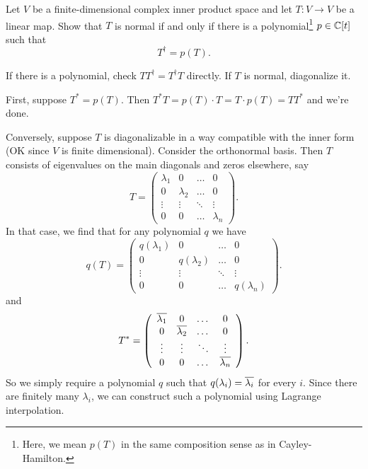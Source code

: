 \begin{problem}
	Let $V$ be a finite-dimensional complex inner product space and let $T \colon V \to V$ be a linear map.
	Show that $T$ is normal if and only if there is a polynomial\footnote{Here,
			we mean $p(T)$ in the same composition sense as in Cayley-Hamilton.}
	$p \in \mathbb C[t]$ such that \[ T^\dagger = p(T). \]
	\begin{hint}
		If there is a polynomial, check $TT^\dagger = T^\dagger T$ directly.
		If $T$ is normal, diagonalize it.
	\end{hint}
	\begin{sol}
		First, suppose $T^\ast = p(T)$.
		Then $T^\ast T = p(T) \cdot T = T \cdot p(T) = T T^\ast$ and we're done.

		Conversely, suppose $T$ is diagonalizable
		in a way compatible with the inner form
		(OK since $V$ is finite dimensional).
		Consider the orthonormal basis.
		Then $T$ consists of eigenvalues on the main diagonals
		and zeros elsewhere, say
		\[ T = \left(
			\begin{array}{cccc}
				\lambda_1 & 0 & \dots & 0 \\
				0 & \lambda_2 & \dots & 0 \\
				\vdots & \vdots & \ddots &  \vdots \\
				0 & 0 & \dots & \lambda_n
			\end{array}
			\right). \]
		In that case, we find that for any polynomial $q$ we have
		\[ q(T) = \left(
			\begin{array}{cccc}
				q(\lambda_1) & 0 & \dots & 0 \\
				0 & q(\lambda_2) & \dots & 0 \\
				\vdots & \vdots & \ddots &  \vdots \\
				0 & 0 & \dots & q(\lambda_n)
			\end{array}
			\right). \]
		and
		\[ T^\ast = \left(
			\begin{array}{cccc}
				\overline{\lambda_1} & 0 & \dots & 0 \\
				0 & \overline{\lambda_2} & \dots & 0 \\
				\vdots & \vdots & \ddots &  \vdots \\
				0 & 0 & \dots & \overline{\lambda_n}
			\end{array}
			\right). \]
		So we simply require a polynomial $q$
		such that $q(\lambda_i) = \overline{\lambda_i}$ for every $i$.
		Since there are finitely many $\lambda_i$,
		we can construct such a polynomial using Lagrange interpolation.
	\end{sol}
\end{problem}

